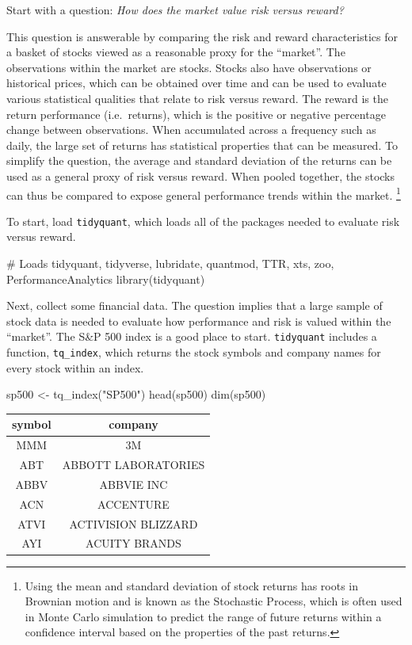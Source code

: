 Start with a question: \emph{How does the market value risk versus
reward?}

This question is answerable by comparing the risk and reward
characteristics for a basket of stocks viewed as a reasonable proxy for
the ``market''. The observations within the market are stocks. Stocks
also have observations or historical prices, which can be obtained over
time and can be used to evaluate various statistical qualities that
relate to risk versus reward. The reward is the return performance
(i.e.~returns), which is the positive or negative percentage change
between observations. When accumulated across a frequency such as daily,
the large set of returns has statistical properties that can be
measured. To simplify the question, the average and standard deviation
of the returns can be used as a general proxy of risk versus reward.
When pooled together, the stocks can thus be compared to expose general
performance trends within the market.
\footnote{Using the mean and standard deviation of stock returns has roots in Brownian motion and is known as the Stochastic Process, which is often used in Monte Carlo simulation to predict the range of future returns within a confidence interval based on the properties of the past returns. }

To start, load \texttt{tidyquant}, which loads all of the packages
needed to evaluate risk versus reward.

\begin{Schunk}
\begin{Sinput}
# Loads tidyquant, tidyverse, lubridate, quantmod, TTR, xts, zoo, PerformanceAnalytics
library(tidyquant)
\end{Sinput}
\end{Schunk}

Next, collect some financial data. The question implies that a large
sample of stock data is needed to evaluate how performance and risk is
valued within the ``market''. The S\&P 500 index is a good place to
start. \texttt{tidyquant} includes a function, \texttt{tq\_index}, which
returns the stock symbols and company names for every stock within an
index.

\begin{Schunk}
\begin{Sinput}
sp500 <- tq_index("SP500")
head(sp500)
dim(sp500)
\end{Sinput}
\end{Schunk}

\begin{tabular}{cc}
\toprule
symbol & company\\
\midrule
MMM & 3M\\
ABT & ABBOTT LABORATORIES\\
ABBV & ABBVIE INC\\
ACN & ACCENTURE\\
ATVI & ACTIVISION BLIZZARD\\
AYI & ACUITY BRANDS\\
\bottomrule
\end{tabular}

